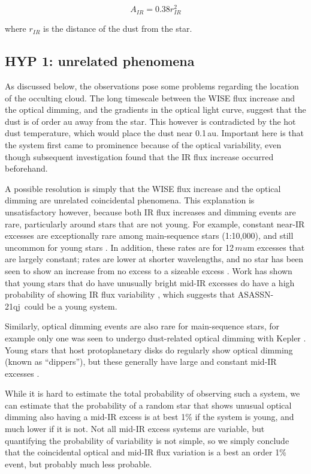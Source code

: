 \documentclass{aa}
\newcommand{\asas}{ASASSN-21qj}
\begin{document}
$$A_{IR}=0.38 r_{IR}^2$$ 

where $r_{IR}$ is the distance of the dust from the star.


\subsection{HYP 1: unrelated phenomena} 

As discussed below, the observations pose some problems regarding the location of the occulting cloud.
%
The long timescale between the WISE flux increase and the optical dimming, and the gradients in the optical light curve, suggest that the dust is of order au away from the star.
%
This however is contradicted by the hot dust temperature, which would place the dust near 0.1\,au.
%
Important here is that the system first came to prominence because of the optical variability, even though subsequent investigation found that the IR flux increase occurred beforehand.

A possible resolution is simply that the WISE flux increase and the optical dimming are unrelated coincidental phenomena.
%
This explanation is unsatisfactory however, because both IR flux increases and dimming events are rare, particularly around stars that are not young.
%
For example, constant near-IR excesses are exceptionally rare among main-sequence stars (1:10,000), and still uncommon for young stars \citep[1:100][]{2013MNRAS.433.2334K}.
%
In addition, these rates are for 12$\,mu$m excesses that are largely constant; rates are lower at shorter wavelengths, and no star has been seen to show an increase from no excess to a sizeable excess \citep[][report a disappearing mid-IR excess, but this is the single example known]{2012Natur.487...74M}.
%
Work has shown that young stars that do have unusually bright mid-IR excesses do have a high probability of showing IR flux variability \citep{2015ApJ...805...77M}, which suggests that \asas~could be a young system.

Similarly, optical dimming events are also rare for main-sequence stars, for example only one was seen to undergo dust-related optical dimming with Kepler \citep{2016MNRAS.457.3988B}.
%
Young stars that host protoplanetary disks do regularly show optical dimming (known as ``dippers''), but these generally have large and constant mid-IR excesses \citep[e.g.][]{2016ApJ...816...69A}.

While it is hard to estimate the total probability of observing such a system, we can estimate that the probability of a random star that shows unusual optical dimming also having a mid-IR excess is at best 1\% if the system is young, and much lower if it is not.
%
Not all mid-IR excess systems are variable, but quantifying the probability of variability is not simple, so we simply conclude that the coincidental optical and mid-IR flux variation is a best an order 1\% event, but probably much less probable.
\end{document}
